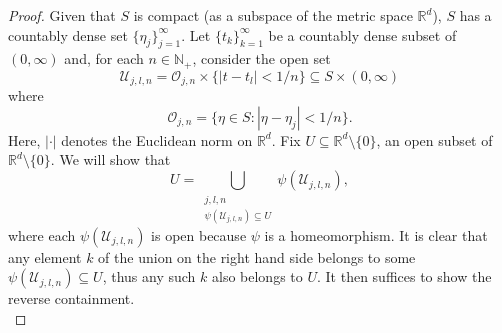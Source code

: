 \documentclass[11pt]{article}
\theoremstyle{theorem}
\begin{document}
\begin{proof}
Given that $S$ is compact (as a subspace of the metric space $\mathbb{R}^d$), $S$ has a countably dense set $\{\eta_j\}_{j=1}^\infty$. Let $\{t_k\}_{k=1}^\infty$ be a countably dense subset of $(0,\infty)$ and, for each $n\in\mathbb{N}_+$, consider the open set
\begin{equation*}
\mathcal{U}_{j,l,n}=\mathcal{O}_{j,n}\times \{ \vert t - t_l \vert < 1/n \}\subseteq S\times (0,\infty)
\end{equation*}
where
\begin{equation*}
\mathcal{O}_{j,n}=\{\eta\in S: |\eta-\eta_j|<1/n\}.
\end{equation*}
Here, $|\cdot|$ denotes the Euclidean norm on $\mathbb{R}^d$. Fix $U\subseteq \mathbb{R}^d\setminus \{0\}$, an open subset of $\mathbb{R}^d\setminus\{0\}$. We will show that
\begin{equation*}
U=\bigcup_{\substack{j,l,n\\ \psi(\mathcal{U}_{j,l,n})\subseteq U}}\psi(\mathcal{U}_{j,l,n}),
\end{equation*}
where each $\psi(\mathcal{U}_{j,l,n})$ is open because $\psi$ is a homeomorphism. It is clear that any element $k$ of the union on the right hand side belongs to some $\psi(\mathcal{U}_{j,l,n}) \subseteq U$, thus any such $k$ also belongs to $U$. It then suffices to show the reverse containment. \\


\end{proof}
\end{document}
